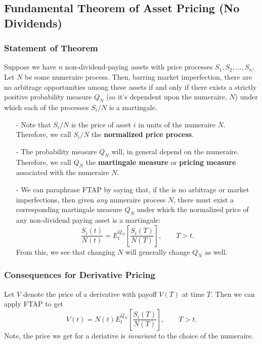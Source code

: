 \documentclass[12pt]{article}
\theoremstyle{plain}
\theoremstyle{definition}
\theoremstyle{remark}
\begin{document}
\newpage
\subsection{Fundamental Theorem of Asset Pricing (No Dividends)}

\subsubsection{Statement of Theorem}

Suppose we have $n$ non-dividend-paying assets with
price processes $S_1, S_2, \ldots, S_n$.  Let $N$ be some numeraire
process.  Then, barring market imperfection, there are no arbitrage
opportunities among these assets if and only if there exists a strictly
positive probability measure $Q_N$ (so it's dependent upon the numeraire,
$N$) under which each of the processes $S_i / N$ is a martingale.
\begin{itemize}
   \item[-]{Note that $S_i/N$ is the price of asset $i$ in units of the
      numeraire $N$.  Therefore, we call $S_i/N$ the \textbf{normalized
      price process}.}
   \item[-]{The probability measure $Q_N$ will, in general depend on
	 the numeraire.  Therefore, we call $Q_N$ the 
	 \textbf{martingale measure} or \textbf{pricing measure} 
	 associated with the numeraire $N$.} 
   \item[-]{We can paraphrase FTAP by saying that, if the is no arbitrage
	 or market imperfections, then given \emph{any} numeraire 
	 process $N$, there must exist a corresponding martingale
	 measure $Q_N$ under which the normalized price of any 
	 non-dividend paying asset is a martingale:
	    \[ \frac{S_i(t)}{N(t)} = E_t^{Q_N}\left[ \frac{S_i(T)}{N(T)}
	       \right], \qquad T > t. \]
	 From this, we see that changing $N$ will generally change 
	 $Q_N$ as well.
      }
\end{itemize}

\subsubsection{Consequences for Derivative Pricing}

Let $V$ denote the price of a derivative with payoff $V(T)$ at time $T$.
Then we can apply FTAP to get
   \[ V(t) = N(t) E_t^{Q_N} \left[ \frac{S_i(T)}{N(T)}
	       \right], \qquad T > t. \]
Note, the price we get for a deriative is \emph{invariant} to the choice
of the numeraire.
\end{document}
